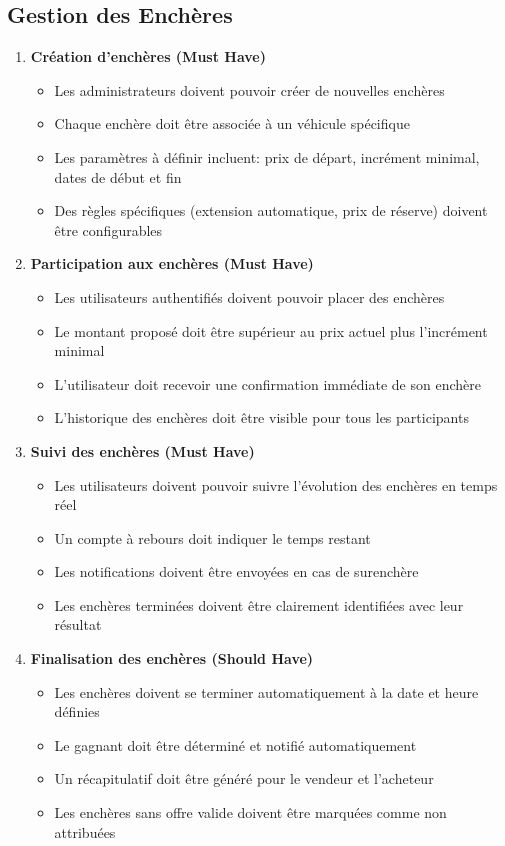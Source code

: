 \subsection{Gestion des Enchères}

\begin{enumerate}
    \item \textbf{Création d'enchères (Must Have)}
    \begin{itemize}
        \item Les administrateurs doivent pouvoir créer de nouvelles enchères
        \item Chaque enchère doit être associée à un véhicule spécifique
        \item Les paramètres à définir incluent: prix de départ, incrément minimal, dates de début et fin
        \item Des règles spécifiques (extension automatique, prix de réserve) doivent être configurables
    \end{itemize}
    
    \item \textbf{Participation aux enchères (Must Have)}
    \begin{itemize}
        \item Les utilisateurs authentifiés doivent pouvoir placer des enchères
        \item Le montant proposé doit être supérieur au prix actuel plus l'incrément minimal
        \item L'utilisateur doit recevoir une confirmation immédiate de son enchère
        \item L'historique des enchères doit être visible pour tous les participants
    \end{itemize}
    
    \item \textbf{Suivi des enchères (Must Have)}
    \begin{itemize}
        \item Les utilisateurs doivent pouvoir suivre l'évolution des enchères en temps réel
        \item Un compte à rebours doit indiquer le temps restant
        \item Les notifications doivent être envoyées en cas de surenchère
        \item Les enchères terminées doivent être clairement identifiées avec leur résultat
    \end{itemize}
    
    \item \textbf{Finalisation des enchères (Should Have)}
    \begin{itemize}
        \item Les enchères doivent se terminer automatiquement à la date et heure définies
        \item Le gagnant doit être déterminé et notifié automatiquement
        \item Un récapitulatif doit être généré pour le vendeur et l'acheteur
        \item Les enchères sans offre valide doivent être marquées comme non attribuées
    \end{itemize}
\end{enumerate}

